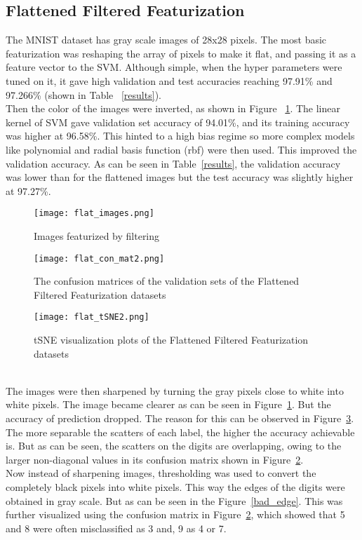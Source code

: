 \documentclass{article}
\begin{document}
\subsection{Flattened Filtered Featurization}
The MNIST dataset has gray scale images of 28x28 pixels. The most basic featurization was reshaping the array of pixels to make it flat, and passing it as a feature vector to the SVM. Although simple, when the hyper parameters were tuned on it, it gave high validation and test accuracies reaching 97.91\% and 97.266\% (shown in Table ~\ref{results}). 
\\
Then the color of the images were inverted, as shown in Figure ~\ref{flat_images}. The linear kernel of SVM gave validation set accuracy of 94.01\%, and its training accuracy was higher at 96.58\%. This hinted to a high bias regime so more complex models like polynomial and radial basis function (rbf) were then used. This improved the validation accuracy. As can be seen in Table~\ref{results}, the validation accuracy was lower than for the flattened images but the test accuracy was slightly higher at 97.27\%. 
\begin{figure}[ht]
    \centerline{\texttt{[image: flat\_images.png]}}
    \caption{Images featurized by filtering}
    \label{flat_images}
\end{figure}
\begin{figure}[ht]
\centerline{\texttt{[image: flat\_con\_mat2.png]}}
\caption{The confusion matrices of the validation sets of the Flattened Filtered Featurization datasets}
\label{flat_con_mat}
\end{figure}
\begin{figure}[ht]
\centerline{\texttt{[image: flat\_tSNE2.png]}}
\caption{tSNE visualization plots of the Flattened Filtered Featurization datasets}
\label{flat_tSNE}
\end{figure}
\\
The images were then sharpened by turning the gray pixels close to white into white pixels. The image became clearer as can be seen in Figure~\ref{flat_images}. But the accuracy of prediction dropped. The reason for this can be observed in Figure~\ref{flat_tSNE}. The more separable the scatters of each label, the higher the accuracy achievable is. But as can be seen, the scatters on the digits are overlapping, owing to the larger non-diagonal values in its confusion matrix shown in Figure~\ref{flat_con_mat}.
\\ 
Now instead of sharpening images, thresholding was used to convert the completely black pixels into white pixels. This way the edges of the digits were obtained in gray scale. But as can be seen in the Figure~\ref{bad_edge}. This was further visualized using the confusion matrix in Figure~\ref{flat_con_mat}, which showed that 5 and 8 were often misclassified as 3 and, 9 as 4 or 7.
\end{document}
